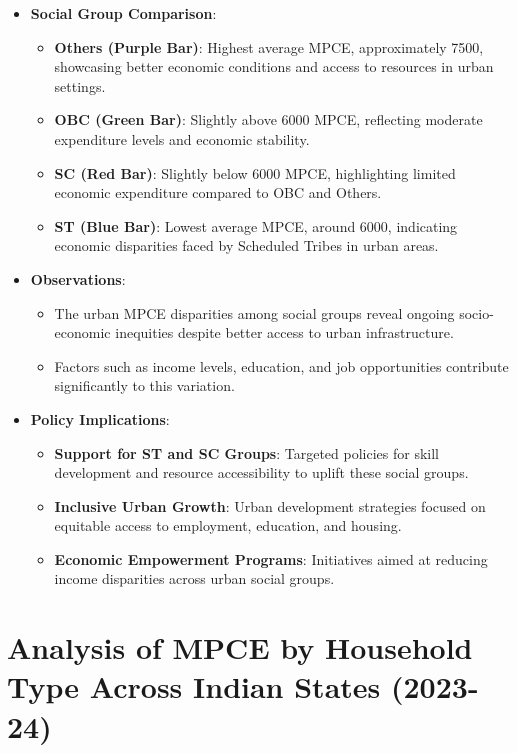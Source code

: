 \documentclass{article}
\begin{document}
\begin{itemize}
	\item \textbf{Social Group Comparison}: 
	\begin{itemize}
		\item \textbf{Others (Purple Bar)}: Highest average MPCE, approximately 7500, showcasing better economic conditions and access to resources in urban settings.
		\item \textbf{OBC (Green Bar)}: Slightly above 6000 MPCE, reflecting moderate expenditure levels and economic stability.
		\item \textbf{SC (Red Bar)}: Slightly below 6000 MPCE, highlighting limited economic expenditure compared to OBC and Others.
		\item \textbf{ST (Blue Bar)}: Lowest average MPCE, around 6000, indicating economic disparities faced by Scheduled Tribes in urban areas.
	\end{itemize}
	\newpage
	\item \textbf{Observations}:
	\begin{itemize}
		\item The urban MPCE disparities among social groups reveal ongoing socio-economic inequities despite better access to urban infrastructure.
		\item Factors such as income levels, education, and job opportunities contribute significantly to this variation.
	\end{itemize}
	\item \textbf{Policy Implications}:
	\begin{itemize}
		\item \textbf{Support for ST and SC Groups}: Targeted policies for skill development and resource accessibility to uplift these social groups.
		\item \textbf{Inclusive Urban Growth}: Urban development strategies focused on equitable access to employment, education, and housing.
		\item \textbf{Economic Empowerment Programs}: Initiatives aimed at reducing income disparities across urban social groups.
	\end{itemize}
\end{itemize}


\newpage









\newpage

\section{Analysis of MPCE by Household Type Across Indian States (2023-24)}
\end{document}
